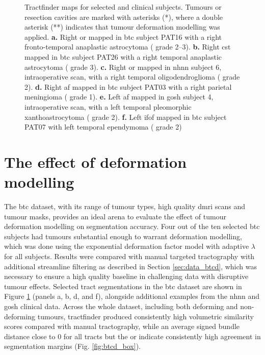 \documentclass[12pt,phd,a4paper,twoside]{ucl_thesis}
\providecommand{\DIFaddbeginFL}{} %
\providecommand{\DIFaddendFL}{} %
\providecommand{\DIFdelbeginFL}{} %
\providecommand{\DIFdelendFL}{} %
\newcommand{\DIFscaledelfig}{0.5}
\newlength{\DIFdelgraphicswidth} %
\newlength{\DIFdelgraphicsheight} %
\newcommand{\DIFaddincludegraphics}[2][]{{\color{blue}\fbox{\DIFOincludegraphics[#1]{#2}}}} %
\newcommand{\DIFdelincludegraphics}[2][]{%
\sbox{\DIFdelgraphicsbox}{\DIFOincludegraphics[#1]{#2}}%
\settoboxwidth{\DIFdelgraphicswidth}{\DIFdelgraphicsbox} %
\settoboxtotalheight{\DIFdelgraphicsheight}{\DIFdelgraphicsbox} %
\scalebox{\DIFscaledelfig}{%
\parbox[b]{\DIFdelgraphicswidth}{\usebox{\DIFdelgraphicsbox}\\[-\baselineskip] \rule{\DIFdelgraphicswidth}{0em}}\llap{\resizebox{\DIFdelgraphicswidth}{\DIFdelgraphicsheight}{%
\setlength{\unitlength}{\DIFdelgraphicswidth}%
\begin{picture}(1,1)%
\thicklines\linethickness{2pt} %
{\color[rgb]{1,0,0}\put(0,0){\framebox(1,1){}}}%
{\color[rgb]{1,0,0}\put(0,0){\line( 1,1){1}}}%
{\color[rgb]{1,0,0}\put(0,1){\line(1,-1){1}}}%
\end{picture}%
}\hspace*{3pt}}} %
} %
\DeclareRobustCommand{\DIFaddbeginFL}{\DIFOaddbeginFL \let\includegraphics\DIFaddincludegraphics} %
\DeclareRobustCommand{\DIFaddendFL}{\DIFOaddendFL \let\includegraphics\DIFOincludegraphics} %
\DeclareRobustCommand{\DIFdelbeginFL}{\DIFOdelbeginFL \let\includegraphics\DIFdelincludegraphics} %
\DeclareRobustCommand{\DIFdelendFL}{\DIFOaddendFL \let\includegraphics\DIFOincludegraphics} %
\begin{document}
\begin{figure}
  
  \caption[Example tractfinder results in tumour patients]{Tractfinder maps for selected  and clinical subjects. Tumours or resection cavities are marked with asterisks (*), where a double asterisk (**) indicates that tumour deformation modelling was applied.
  \textbf{\sffamily a.} Right \gls{or} mapped in \gls{btc} subject PAT16 with a right fronto-temporal anaplastic astrocytoma (\DIFdelbeginFL %
\DIFdelendFL \DIFaddbeginFL {} \DIFaddendFL grade 2--3).
  \textbf{\sffamily b.} Right \gls{cst} mapped in \gls{btc} subject PAT26 with a right temporal anaplastic astrocytoma (\DIFdelbeginFL %
\DIFdelendFL \DIFaddbeginFL {} \DIFaddendFL grade 3).
  \textbf{\sffamily c.} Right \gls{or} mapped in \gls{nhnn} subject 6, intraoperative scan, with a right temporal oligodendroglioma ( grade 2).
  \textbf{\sffamily d.} Right \gls{af} mapped in \gls{btc} subject PAT03 with a right parietal meningioma ( grade 1).
  \textbf{\sffamily e.} Left \gls{af} mapped in \gls{gosh} subject 4, intraoperative scan, with a left temporal pleomorphic xanthoastrocytoma ( grade 2).
  \textbf{\sffamily f.} Left \gls{ifof} mapped in \gls{btc} subject PAT07 with left temporal ependymoma ( grade 2)}
  \label{fig:tumours}
\end{figure}

\section{The effect of deformation modelling}
\label{sec:btcd}

The \gls{btc} dataset, with its range of tumour types, high quality \gls{dmri} scans and tumour masks, provides an ideal arena to evaluate the effect of tumour deformation modelling on segmentation accuracy.
Four out of the ten selected \gls{btc} subjects had tumours substantial enough to warrant deformation modelling, which was done using the exponential deformation factor model with adaptive $\lambda$ for all subjects.
Results were compared with manual targeted tractography with additional streamline filtering as described in Section \ref{sec:data_btcd}, which was necessary to ensure a high quality baseline in challenging data with disruptive tumour effects.
Selected tract segmentations in the \gls{btc} dataset are shown in Figure \ref{fig:tumours} (panels a, b, d, and f), alongside additional examples from the \gls{nhnn} and \gls{gosh} clinical data.
Across the whole dataset, including both deforming and non-deforming tumours, tractfinder produced consistently high volumetric similarity scores compared with manual tractography, while an average signed bundle distance close to 0 for all tracts but the \gls{or} indicate consistently high agreement in segmentation margins (Fig. \ref{fig:btcd_box}).
\end{document}
